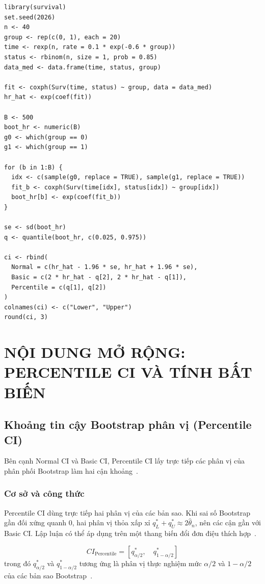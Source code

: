 \documentclass[12pt,a4paper]{article}
\theoremstyle{definition}
\numberwithin{equation}{section}
\begin{document}
\begin{lstlisting}[style=Rstyle, caption={Bootstrap HR}]
library(survival)
set.seed(2026)
n <- 40
group <- rep(c(0, 1), each = 20)
time <- rexp(n, rate = 0.1 * exp(-0.6 * group))
status <- rbinom(n, size = 1, prob = 0.85)
data_med <- data.frame(time, status, group)

fit <- coxph(Surv(time, status) ~ group, data = data_med)
hr_hat <- exp(coef(fit))

B <- 500
boot_hr <- numeric(B)
g0 <- which(group == 0)
g1 <- which(group == 1)

for (b in 1:B) {
  idx <- c(sample(g0, replace = TRUE), sample(g1, replace = TRUE))
  fit_b <- coxph(Surv(time[idx], status[idx]) ~ group[idx])
  boot_hr[b] <- exp(coef(fit_b))
}

se <- sd(boot_hr)
q <- quantile(boot_hr, c(0.025, 0.975))

ci <- rbind(
  Normal = c(hr_hat - 1.96 * se, hr_hat + 1.96 * se),
  Basic = c(2 * hr_hat - q[2], 2 * hr_hat - q[1]),
  Percentile = c(q[1], q[2])
)
colnames(ci) <- c("Lower", "Upper")
round(ci, 3)
\end{lstlisting}


\newpage
\section{NỘI DUNG MỞ RỘNG: PERCENTILE CI VÀ TÍNH BẤT BIẾN}

\subsection{Khoảng tin cậy Bootstrap phân vị (Percentile CI)}

Bên cạnh Normal CI và Basic CI, Percentile CI lấy trực tiếp các phân vị của phân phối Bootstrap làm hai cận khoảng~\cite{rizzo2019,efron1993,quyen2025}.

\subsubsection{Cơ sở và công thức}
Percentile CI dùng trực tiếp hai phân vị của các bản sao. Khi sai số
Bootstrap gần đối xứng quanh $0$, hai phân vị thỏa xấp xỉ
$q_L^*+q_U^*\approx2\hat\theta_n$, nên các cận gần với Basic CI.
Lập luận có thể áp dụng trên một thang biến đổi đơn điệu thích hợp~\cite[tr.~160--163]{efron1993}.

\begin{equation}
	CI_{\text{Percentile}} = \left[ q_{\alpha/2}^*, \quad q_{1-\alpha/2}^* \right]
\end{equation}
trong đó $q_{\alpha/2}^*$ và $q_{1-\alpha/2}^*$ tương ứng là phân vị thực nghiệm mức $\alpha/2$ và $1-\alpha/2$ của các bản sao Bootstrap~\cite{buithuytrang2026,rizzo2019}.
\end{document}
